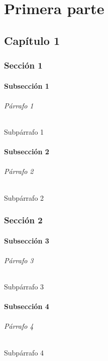 \documentclass[11pt,a4paper]{book}
\author{Jhon Roly Ordoñez Leon}
\begin{document}
    
    \tableofcontents

    \part{Primera parte}
     \chapter{Capítulo 1}
      \section{Sección 1}
       \subsection{Subsección 1}
        \lipsum[1]
        \paragraph{Párrafo 1 }
        \lipsum[2] 
        \subparagraph{Subpárrafo 1} 
        \lipsum[4] 
        \subsection{Subsección 2}
        \lipsum[1]
        \paragraph{Párrafo 2 }
        \lipsum[2] 
        \subparagraph{Subpárrafo 2} 
        \lipsum[4] 
      \section{Sección 2}
       \subsection{Subsección 3}
       \lipsum[1]
       \paragraph{Párrafo 3 }
       \lipsum[2] 
       \subparagraph{Subpárrafo 3} 
       \lipsum[4] 
       \subsection{Subsección 4}
       \lipsum[1]
       \paragraph{Párrafo 4 }
       \lipsum[2] 
       \subparagraph{Subpárrafo 4} 
       \lipsum[4] 
\end{document}
